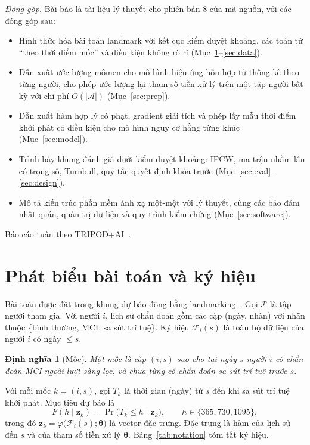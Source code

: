 \documentclass[journal]{IEEEtran}
\newtheorem{definition}{Định nghĩa}
\begin{document}
\emph{Đóng góp.} Bài báo là tài liệu lý thuyết cho phiên bản 8 của mã nguồn, với các đóng góp sau:
\begin{itemize}
\item Hình thức hóa bài toán landmark với kết cục kiểm duyệt khoảng, các toán tử ``theo thời điểm mốc'' và điều kiện không rò rỉ (Mục~\ref{sec:problem}--\ref{sec:data}).
\item Dẫn xuất ước lượng mômen cho mô hình hiệu ứng hỗn hợp từ thống kê theo từng người, cho phép ước lượng lại tham số tiền xử lý trên một tập người bất kỳ với chi phí $O(|\mathcal{A}|)$ (Mục~\ref{sec:prep}).
\item Dẫn xuất hàm hợp lý có phạt, gradient giải tích và phép lấy mẫu thời điểm khởi phát có điều kiện cho mô hình nguy cơ hằng từng khúc (Mục~\ref{sec:model}).
\item Trình bày khung đánh giá dưới kiểm duyệt khoảng: IPCW, ma trận nhầm lẫn có trọng số, Turnbull, quy tắc quyết định khóa trước (Mục~\ref{sec:eval}--\ref{sec:design}).
\item Mô tả kiến trúc phần mềm ánh xạ một-một với lý thuyết, cùng các bảo đảm nhất quán, quản trị dữ liệu và quy trình kiểm chứng (Mục~\ref{sec:software}).
\end{itemize}
Báo cáo tuân theo TRIPOD+AI~\cite{tripod}.

\section{Phát biểu bài toán và ký hiệu}\label{sec:problem}
Bài toán được đặt trong khung dự báo động bằng landmarking~\cite{vanhouwelingen2007}. Gọi $\mathcal{P}$ là tập người tham gia. Với người $i$, lịch sử chẩn đoán gồm các cặp (ngày, nhãn) với nhãn thuộc \{bình thường, MCI, sa sút trí tuệ\}. Ký hiệu $\mathcal{F}_i(s)$ là toàn bộ dữ liệu của người $i$ có ngày $\le s$.

\begin{definition}[Mốc]
Một mốc là cặp $(i,s)$ sao cho tại ngày $s$ người $i$ có chẩn đoán MCI ngoài lượt sàng lọc, và chưa từng có chẩn đoán sa sút trí tuệ trước $s$.
\end{definition}

Với mỗi mốc $k=(i,s)$, gọi $T_k$ là thời gian (ngày) từ $s$ đến khi sa sút trí tuệ khởi phát. Mục tiêu dự báo là
\begin{equation}\label{eq:target}
F(h \mid \bm z_k) = \Pr\bigl(T_k \le h \mid \bm z_k\bigr),\qquad h\in\{365, 730, 1095\},
\end{equation}
trong đó $\bm z_k=\varphi\bigl(\mathcal{F}_i(s);\bm\theta\bigr)$ là vector đặc trưng. Đặc trưng là hàm của lịch sử đến $s$ và của tham số tiền xử lý $\bm\theta$. Bảng~\ref{tab:notation} tóm tắt ký hiệu.
\end{document}
